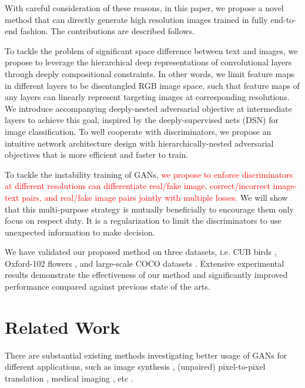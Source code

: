 \documentclass[10pt,twocolumn,letterpaper]{article}
\begin{document}
With careful consideration of these reasons, in this paper, we propose a novel method that can directly generate high resolution images trained in fully end-to-end fashion. The contributions are described follows.

To tackle the problem of significant space difference between text and images, we propose to leverage the hierarchical deep representations of convolutional layers through deeply compositional constraints. In other words, we limit feature maps in different layers to be disentangled RGB image space, such that feature maps of any layers can linearly represent targeting images at corresponding resolutions. We introduce accompanying deeply-nested adversarial objective at intermediate layers to achieve this goal, inspired by the deeply-supervised nets (DSN) \cite{lee2015deeply} for image classification.
To well cooperate with discriminators, we propose an intuitive network architecture design with hierarchically-nested adversarial objectives that is more efficient and faster to train.

To tackle the instability training of GANs, \textcolor{red}{we propose to enforce discriminators at different resolutions can differentiate real/fake image, correct/incorrect image-text pairs, and real/fake image pairs jointly with multiple losses.} We will show that this multi-purpose strategy is mutually beneficially to encourage them only focus on respect duty. It is a regularization to limit the discriminators to use unexpected information to make decision. 

We have validated our proposed method on three datasets, i.e. CUB birds \cite{}, Oxford-102 flowers \cite{}, and large-scale COCO datasets \cite{}. Extensive experimental results demonstrate the effectiveness of our method and significantly improved performance compared against previous state of the arts.


\section{Related Work}
There are substantial existing methods investigating better usage of GANs \cite{goodfellow2014generative,radford2015unsupervised} for different applications, such as image synthesis \cite{shrivastava2016learning}, (unpaired) pixel-to-pixel translation \cite{isola2016image,zhu2017unpaired},  medical imaging \cite{costa2017towards}, etc \cite{}.
\end{document}
